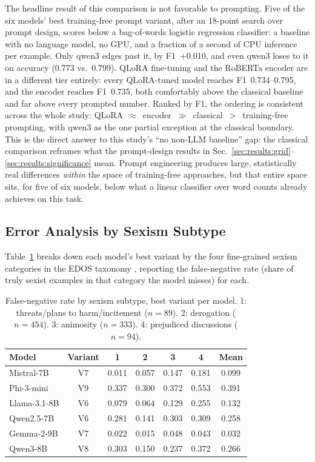 The headline result of this comparison is not favorable to prompting.
Five of the six models' best training-free prompt variant, after
an 18-point search over prompt design, scores below a bag-of-words
logistic regression classifier: a baseline with no language model,
no GPU, and a fraction of a second of CPU inference per example. Only
qwen3 edges past it, by F1~+0.010, and even qwen3 loses to it on
accuracy (0.773 vs.\ 0.799). QLoRA fine-tuning and the RoBERTa encoder
are in a different tier entirely: every QLoRA-tuned model reaches
F1~0.734--0.795, and the encoder reaches F1~0.735, both comfortably
above the classical baseline and far above every prompted number.
Ranked by F1, the ordering is consistent across the whole study:
QLoRA~$\approx$~encoder~$\gg$~classical~$>$~training-free prompting,
with qwen3 as the one partial exception at the classical boundary. This
is the direct answer to this study's ``no non-LLM baseline'' gap: the
classical comparison reframes what the prompt-design results in
Sec.~\ref{sec:results:grid}--\ref{sec:results:significance} mean.
Prompt engineering produces large, statistically real differences
\emph{within} the space of training-free approaches, but that entire
space sits, for five of six models, below what a linear classifier over
word counts already achieves on this task.

\subsection{Error Analysis by Sexism Subtype}
\label{sec:results:subtype}

Table~\ref{tab:subtype} breaks down each model's best variant by the
four fine-grained sexism categories in the EDOS taxonomy
\cite{kirk2023semeval}, reporting the false-negative rate (share of
truly sexist examples in that category the model misses) for each.

\begin{table}[t]
\centering
\footnotesize
\caption{False-negative rate by sexism subtype, best variant per model.
1: threats/plans to harm/incitement ($n=89$). 2: derogation ($n=454$).
3: animosity ($n=333$). 4: prejudiced discussions ($n=94$).}
\label{tab:subtype}
\begin{tabular}{lcccccc}
\toprule
Model & Variant & 1 & 2 & 3 & 4 & Mean \\
\midrule
Mistral-7B & V7 & 0.011 & 0.057 & 0.147 & 0.181 & 0.099 \\
Phi-3-mini & V9 & 0.337 & 0.300 & 0.372 & 0.553 & 0.391 \\
Llama-3.1-8B & V6 & 0.079 & 0.064 & 0.129 & 0.255 & 0.132 \\
Qwen2.5-7B & V6 & 0.281 & 0.141 & 0.303 & 0.309 & 0.258 \\
Gemma-2-9B & V7 & 0.022 & 0.015 & 0.048 & 0.043 & 0.032 \\
Qwen3-8B & V8 & 0.303 & 0.150 & 0.237 & 0.372 & 0.266 \\
\bottomrule
\end{tabular}
\end{table}

